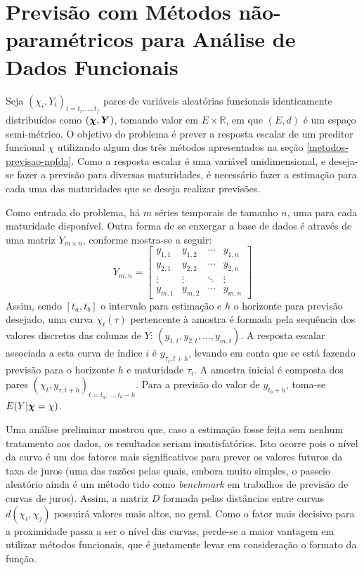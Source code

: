 \documentclass[
	12pt,				%
	openright,			%
	oneside,			%
	a4paper,			%
	english,			%
	brazil				%
	]{dissertacao-ufrgs-abntex2}
\begin{document}
\section{Previsão com Métodos não-paramétricos para Análise de Dados Funcionais} \label{metodologia-npfda}

Seja $(\chi_i,Y_i)_{i=t_i,...,t_f}$ pares de variáveis aleatórias funcionais identicamente distribuídos como $(\boldsymbol{\chi},\boldsymbol{Y})$, tomando valor em $E \times \mathbb{R}$, em que $(E,d)$ é um espaço semi-métrico. O objetivo do problema é prever a resposta escalar de um preditor funcional $\chi$ utilizando algum dos três métodos apresentados na seção \ref{metodos-previsao-npfda}. Como a resposta escalar é uma variável unidimensional, e deseja-se fazer a previsão para diversas maturidades, é necessário fazer a estimação para cada uma das maturidades que se deseja realizar previsões.

Como entrada do problema, há $m$ séries temporais de tamanho $n$, uma para cada maturidade disponível. Outra forma de se enxergar a base de dados é através de uma matriz $Y_{m \times n}$, conforme mostra-se a seguir:
\begin{equation} 
Y_{m,n} = 
 \begin{bmatrix}
	  y_{1,1} & y_{1,2} & \cdots & y_{1,n} \\
	  y_{2,1} & y_{2,2} & \cdots & y_{2,n} \\
	  \vdots  & \vdots  & \ddots & \vdots  \\
	  y_{m,1} & y_{m,2} & \cdots & y_{m,n}
 \end{bmatrix}
\end{equation}
Assim, sendo $[t_a,t_b]$ o intervalo para estimação e $h$ o horizonte para previsão desejado, uma  curva $\chi_t(\tau)$ pertencente à amostra é formada pela sequência dos valores discretos das colunas de $Y$: $(y_{1,t},y_{2,t}, ... , y_{m,t})$. A resposta escalar associada a esta curva de índice $i$ é $y_{\tau_i,t + h}$, levando em conta que se está fazendo previsão para o horizonte $h$ e maturidade $\tau_i$. A amostra inicial é composta dos pares $(\chi_t,y_{\tau,t+h})_{t=t_a,...,t_b-h}$. Para a previsão do valor de $y_{t_b+h}$, toma-se $E(Y|\boldsymbol{\chi}=\chi)$. 

Uma análise preliminar mostrou que, caso a estimação fosse feita sem nenhum tratamento aos dados, os resultados seriam insatisfatórios. Isto ocorre pois o nível da curva é um dos fatores mais significativos para prever os valores futuros da taxa de juros (uma das razões pelas quais, embora muito simples, o passeio aleatório ainda é um método tido como \emph{benchmark} em trabalhos de previsão de curvas de juros). Assim, a matriz $D$ formada pelas distâncias entre curvas $d(\chi_i,\chi_j)$ possuirá valores mais altos, no geral. Como o fator mais decisivo para a proximidade passa a ser o nível das curvas, perde-se a maior vantagem em utilizar métodos funcionais, que é justamente levar em consideração o formato da função.
\end{document}
